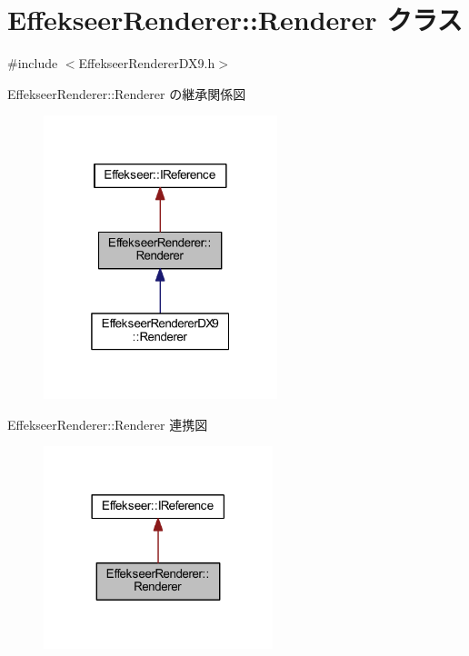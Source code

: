 \hypertarget{class_effekseer_renderer_1_1_renderer}{}\section{Effekseer\+Renderer\+:\+:Renderer クラス}
\label{class_effekseer_renderer_1_1_renderer}


{\ttfamily \#include $<$Effekseer\+Renderer\+D\+X9.\+h$>$}



Effekseer\+Renderer\+:\+:Renderer の継承関係図\nopagebreak
\begin{figure}[H]
\begin{center}
\leavevmode
\includegraphics[width=193pt]{class_effekseer_renderer_1_1_renderer__inherit__graph}
\end{center}
\end{figure}


Effekseer\+Renderer\+:\+:Renderer 連携図\nopagebreak
\begin{figure}[H]
\begin{center}
\leavevmode
\includegraphics[width=189pt]{class_effekseer_renderer_1_1_renderer__coll__graph}
\end{center}
\end{figure}
